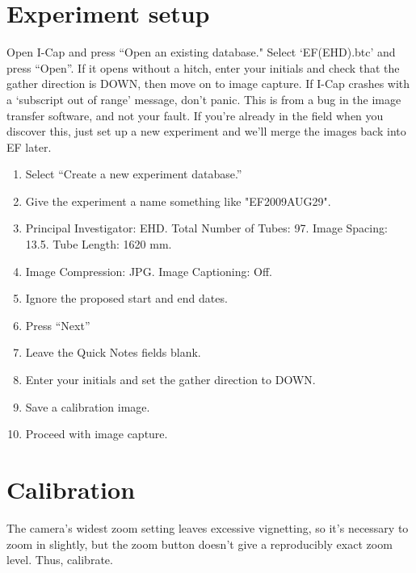 \documentclass[11pt]{article}
\begin{document}
\section{Experiment setup}
	Open I-Cap and press ``Open an existing database." Select `EF(EHD).btc' and press ``Open''. If it opens without a hitch, enter your initials and check that the gather direction is DOWN, then move on to image capture.
	If I-Cap crashes with a `subscript out of range' message, don't panic. This is from  a bug in the image transfer software, and not your fault. If you're already in the field  when you discover this, just set up a new experiment and we'll merge the images back into EF later.
\begin{enumerate}
	\item{Select ``Create a new experiment database.''}
	\item{Give the experiment a name something like "EF2009AUG29".}
	\item{Principal Investigator: EHD. Total Number of Tubes: 97. Image Spacing: 13.5. Tube Length: 1620 mm.}
	\item{Image Compression: JPG. Image Captioning: Off.}
	\item{Ignore the proposed start and end dates.}
	\item{Press ``Next''}
	\item{Leave the Quick Notes fields blank.}
	\item{Enter your initials and set the gather direction to DOWN.}
	\item{Save a calibration image.}
	\item{Proceed with image capture.}
\end{enumerate}

		
\section{Calibration}
	The camera's widest zoom setting leaves excessive vignetting, so it's necessary to zoom in slightly, but the zoom button doesn't give a reproducibly exact zoom level. Thus, calibrate. 
	
\end{document}
